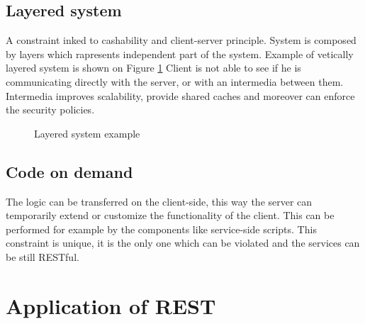 \subsection{Layered system}

A constraint inked to cashability and client-server principle. System is composed by layers which rapresents independent part of the system. Example of vetically layered system is shown on Figure \ref{fig:layered-system} Client is not able to see if he is communicating directly with the server, or with an intermedia between them. Intermedia improves scalability, provide shared caches and moreover can enforce the security policies.

\begin{figure}[htp] 
\caption{Layered system example}
\label{fig:layered-system}
\end{figure} 

\subsection{Code on demand}

The logic can be transferred on the client-side, this way the server can temporarily extend or customize the functionality of the client. This can be performed for example by the components like service-side scripts.
This constraint is unique, it is the only one which can be violated and the services can be still RESTful.

\section{Application of REST}

